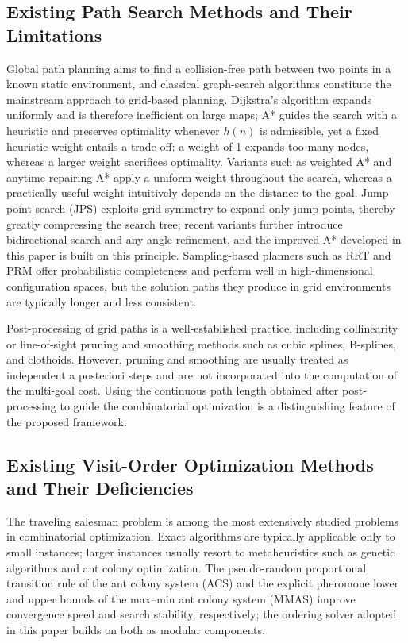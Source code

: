 \documentclass[pdflatex,sn-basic,Numbered]{sn-jnl}
\begin{document}
\subsection{Existing Path Search Methods and Their Limitations}

Global path planning aims to find a collision-free path between two points in a known static environment, and classical graph-search algorithms constitute the mainstream approach to grid-based planning\cite{ref33,ref34,ref35}. Dijkstra's algorithm expands uniformly and is therefore inefficient on large maps\cite{ref6}; A* guides the search with a heuristic and preserves optimality whenever $h(n)$ is admissible\cite{ref5}, yet a fixed heuristic weight entails a trade-off: a weight of 1 expands too many nodes, whereas a larger weight sacrifices optimality\cite{ref8}. Variants such as weighted A* and anytime repairing A* apply a uniform weight throughout the search\cite{ref8,ref10}, whereas a practically useful weight intuitively depends on the distance to the goal. Jump point search (JPS) exploits grid symmetry to expand only jump points, thereby greatly compressing the search tree\cite{ref11,ref12,ref44}; recent variants further introduce bidirectional search and any-angle refinement\cite{ref13,ref14,ref15}, and the improved A* developed in this paper is built on this principle. Sampling-based planners such as RRT\cite{ref7} and PRM offer probabilistic completeness and perform well in high-dimensional configuration spaces, but the solution paths they produce in grid environments are typically longer and less consistent.

Post-processing of grid paths is a well-established practice, including collinearity or line-of-sight pruning\cite{ref16} and smoothing methods such as cubic splines, B-splines, and clothoids\cite{ref17,ref18,ref41}. However, pruning and smoothing are usually treated as independent a posteriori steps and are not incorporated into the computation of the multi-goal cost. Using the continuous path length obtained after post-processing to guide the combinatorial optimization is a distinguishing feature of the proposed framework.

\subsection{Existing Visit-Order Optimization Methods and Their Deficiencies}

The traveling salesman problem is among the most extensively studied problems in combinatorial optimization\cite{ref4,ref36}. Exact algorithms are typically applicable only to small instances; larger instances usually resort to metaheuristics such as genetic algorithms\cite{ref19} and ant colony optimization\cite{ref21,ref42}. The pseudo-random proportional transition rule of the ant colony system (ACS)\cite{ref22} and the explicit pheromone lower and upper bounds of the max--min ant colony system (MMAS)\cite{ref23} improve convergence speed and search stability, respectively; the ordering solver adopted in this paper builds on both as modular components.
\end{document}
